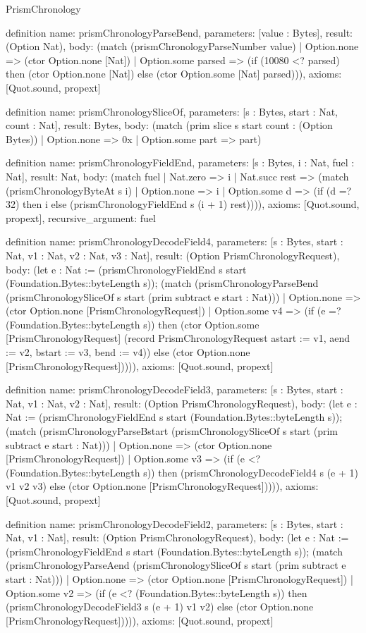 \begin{lexlean}{PrismChronology}
\begin{semanticmodule}
definition{
  name: prismChronologyParseBend,
  parameters: [value : Bytes],
  result: (Option Nat),
  body: (match (prismChronologyParseNumber value)
    | Option.none => (ctor Option.none [Nat])
    | Option.some parsed => (if (10080 <? parsed) then (ctor Option.none [Nat]) else (ctor Option.some [Nat] parsed))),
  axioms: [Quot.sound, propext]
}

definition{
  name: prismChronologySliceOf,
  parameters: [s : Bytes, start : Nat, count : Nat],
  result: Bytes,
  body: (match (prim slice s start count : (Option Bytes))
    | Option.none => 0x
    | Option.some part => part)
}

definition{
  name: prismChronologyFieldEnd,
  parameters: [s : Bytes, i : Nat, fuel : Nat],
  result: Nat,
  body: (match fuel
    | Nat.zero => i
    | Nat.succ rest => (match (prismChronologyByteAt s i)
      | Option.none => i
      | Option.some d => (if (d =? 32) then i else (prismChronologyFieldEnd s (i + 1) rest)))),
  axioms: [Quot.sound, propext],
  recursive_argument: fuel
}

definition{
  name: prismChronologyDecodeField4,
  parameters: [s : Bytes, start : Nat, v1 : Nat, v2 : Nat, v3 : Nat],
  result: (Option PrismChronologyRequest),
  body: (let e : Nat := (prismChronologyFieldEnd s start (Foundation.Bytes::byteLength s)); (match (prismChronologyParseBend (prismChronologySliceOf s start (prim subtract e start : Nat)))
    | Option.none => (ctor Option.none [PrismChronologyRequest])
    | Option.some v4 => (if (e =? (Foundation.Bytes::byteLength s)) then (ctor Option.some [PrismChronologyRequest] (record PrismChronologyRequest {astart := v1, aend := v2, bstart := v3, bend := v4})) else (ctor Option.none [PrismChronologyRequest])))),
  axioms: [Quot.sound, propext]
}

definition{
  name: prismChronologyDecodeField3,
  parameters: [s : Bytes, start : Nat, v1 : Nat, v2 : Nat],
  result: (Option PrismChronologyRequest),
  body: (let e : Nat := (prismChronologyFieldEnd s start (Foundation.Bytes::byteLength s)); (match (prismChronologyParseBstart (prismChronologySliceOf s start (prim subtract e start : Nat)))
    | Option.none => (ctor Option.none [PrismChronologyRequest])
    | Option.some v3 => (if (e <? (Foundation.Bytes::byteLength s)) then (prismChronologyDecodeField4 s (e + 1) v1 v2 v3) else (ctor Option.none [PrismChronologyRequest])))),
  axioms: [Quot.sound, propext]
}

definition{
  name: prismChronologyDecodeField2,
  parameters: [s : Bytes, start : Nat, v1 : Nat],
  result: (Option PrismChronologyRequest),
  body: (let e : Nat := (prismChronologyFieldEnd s start (Foundation.Bytes::byteLength s)); (match (prismChronologyParseAend (prismChronologySliceOf s start (prim subtract e start : Nat)))
    | Option.none => (ctor Option.none [PrismChronologyRequest])
    | Option.some v2 => (if (e <? (Foundation.Bytes::byteLength s)) then (prismChronologyDecodeField3 s (e + 1) v1 v2) else (ctor Option.none [PrismChronologyRequest])))),
  axioms: [Quot.sound, propext]
}


\end{semanticmodule}
\end{lexlean}
